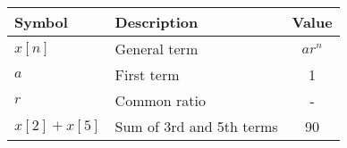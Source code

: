 \begin{tabular}{|l|l|c|}
\hline
\textbf{Symbol} & \textbf{Description} & \textbf{Value} \\
\hline
$x[n]$ & General term & \(ar^n\) \\
\hline
$a$ & First term & 1 \\
\hline
$r$ & Common ratio & - \\
\hline
\(x[2] + x[5]\) & Sum of 3rd and 5th terms & 90 \\
\hline
\end{tabular}
